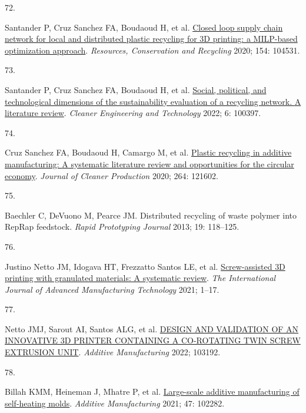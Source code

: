 \documentclass[
  11pt,
  a4paperpaper,
  onecolumn]{article}
\newlength{\cslhangindent}
\newlength{\csllabelwidth}
\newlength{\cslentryspacingunit} %
\newenvironment{CSLReferences}[2] %
 {%
  \setlength{\parindent}{0pt}
  \ifodd #1
  \let\oldpar\par
  \def\par{\hangindent=\cslhangindent\oldpar}
  \fi
  \setlength{\parskip}{#2\cslentryspacingunit}
 }%
 {}
\newcommand{\CSLLeftMargin}[1]{\parbox[t]{\csllabelwidth}{#1}}
\newcommand{\CSLRightInline}[1]{\parbox[t]{\linewidth - \csllabelwidth}{#1}\break}
\begin{document}
\begin{CSLReferences}{0}{0}
\leavevmode{}%
\CSLLeftMargin{72. }%
\CSLRightInline{Santander P, Cruz Sanchez FA, Boudaoud H, et al.
\href{https://doi.org/10.1016/j.resconrec.2019.104531}{{Closed loop
supply chain network for local and distributed plastic recycling for 3D
printing: a MILP-based optimization approach}}. \emph{Resources,
Conservation and Recycling} 2020; 154: 104531.}

\leavevmode{}%
\CSLLeftMargin{73. }%
\CSLRightInline{Santander P, Cruz Sanchez FA, Boudaoud H, et al.
\href{https://doi.org/10.1016/j.clet.2022.100397}{Social, political, and
technological dimensions of the sustainability evaluation of a recycling
network. {A} literature review}. \emph{Cleaner Engineering and
Technology} 2022; 6: 100397.}

\leavevmode{}%
\CSLLeftMargin{74. }%
\CSLRightInline{Cruz Sanchez FA, Boudaoud H, Camargo M, et al.
\href{https://doi.org/10.1016/j.jclepro.2020.121602}{Plastic recycling
in additive manufacturing: {A} systematic literature review and
opportunities for the circular economy}. \emph{Journal of Cleaner
Production} 2020; 264: 121602.}

\leavevmode{}%
\CSLLeftMargin{75. }%
\CSLRightInline{Baechler C, DeVuono M, Pearce JM. {Distributed recycling
of waste polymer into RepRap feedstock}. \emph{Rapid Prototyping
Journal} 2013; 19: 118--125.}

\leavevmode{}%
\CSLLeftMargin{76. }%
\CSLRightInline{Justino Netto JM, Idogava HT, Frezzatto Santos LE, et
al. \href{https://doi.org/10.1007/s00170-021-07365-z}{Screw-assisted
{3D} printing with granulated materials: A systematic review}. \emph{The
International Journal of Advanced Manufacturing Technology} 2021;
1--17.}

\leavevmode{}%
\CSLLeftMargin{77. }%
\CSLRightInline{Netto JMJ, Sarout AI, Santos ALG, et al.
\href{https://doi.org/10.1016/j.addma.2022.103192}{{DESIGN AND
VALIDATION OF AN INNOVATIVE 3D PRINTER CONTAINING A CO-ROTATING TWIN
SCREW EXTRUSION UNIT}}. \emph{Additive Manufacturing} 2022; 103192.}

\leavevmode{}%
\CSLLeftMargin{78. }%
\CSLRightInline{Billah KMM, Heineman J, Mhatre P, et al.
\href{https://doi.org/10.1016/J.ADDMA.2021.102282}{Large-scale additive
manufacturing of self-heating molds}. \emph{Additive Manufacturing}
2021; 47: 102282.}


\end{CSLReferences}
\end{document}
